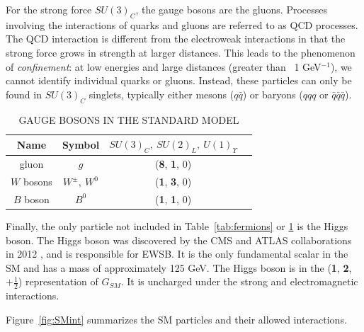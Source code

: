 For the strong force $SU(3)_C$, the gauge bosons are the gluons. Processes involving the interactions of quarks and gluons are referred to as QCD processes. The QCD interaction is different from the electroweak interactions in that the strong force grows in strength at larger distances. This leads to the phenomenon of \textit{confinement}: at low energies and large distances (greater than ~1 GeV$^{-1}$), we cannot identify individual quarks or gluons. Instead, these particles can only be found in $SU(3)_C$ singlets, typically either mesons ($q\bar{q}$) or baryons ($qqq$ or $\bar{q}\bar{q}\bar{q}$). 

\begin{table}[ht]
    \caption{GAUGE BOSONS IN THE STANDARD MODEL}
    \centering
    \begin{tabular}{|c|c|c|c|}
    \hline
    \hline
    Name  & Symbol & $SU(3)_C,~SU(2)_L,~U(1)_\Upsilon $\\
  	  \hline
           \hline    
gluon         & $g$   & (\textbf{8}, \textbf{1}, 0) \\
\hline
$W$ bosons & $W^\pm,~W^0$ & (\textbf{1}, \textbf{3}, 0) \\
\hline
$B$ boson & $B^0$ & (\textbf{1}, \textbf{1}, 0) \\
           \hline
           \hline
    \end{tabular}
    \label{tab:bosons}
\end{table}


Finally, the only particle not included in Table~\ref{tab:fermions} or \ref{tab:bosons} is the Higgs boson. The Higgs boson was discovered by the CMS and ATLAS collaborations in 2012 \cite{ATLASHiggs,CMSHiggs}, and is responsible for EWSB. It is the only fundamental scalar in the SM and has a mass of approximately 125 GeV. The Higgs boson is in the (\textbf{1}, \textbf{2}, $+\frac{1}{2}$) representation of $G_{SM}$. It is uncharged under the strong and electromagnetic interactions. 

Figure~\ref{fig:SMint} summarizes the SM particles and their allowed interactions.

